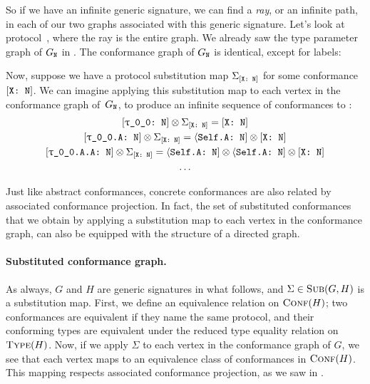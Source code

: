 \documentclass[../generics]{subfiles}
\begin{document}
So if we have an infinite generic signature, we can find a \emph{ray}, or an infinite path, in each of our two graphs associated with this generic signature. Let's look at protocol~\tN, where the ray is the entire graph. We already saw the type parameter graph of $G_{\texttt{N}}$ in . The conformance graph of $G_{\texttt{N}}$ is identical, except for labels:
\begin{center}
\end{center}

Now, suppose we have a protocol substitution map $\Sigma_{[\texttt{X:~N}]}$ for some conformance $[\texttt{X:~N}]$. We can imagine applying this substitution map to each vertex in the conformance graph of~$G_{\texttt{N}}$, to produce an infinite sequence of conformances to \tN:
\begin{gather*}
\ConfReq{\rT}{N}\otimes\Sigma_{\XN}=\XN\\
\ConfReq{\rT.A}{N}\otimes\Sigma_{\XN}=\SelfAToN\otimes\XN\\
\ConfReq{\rT.A.A}{N}\otimes\Sigma_{\XN}=\SelfAToN\otimes\SelfAToN\otimes\XN\\
\ldots
\end{gather*}

Just like abstract conformances, concrete conformances are also related by associated conformance projection. In fact, the set of substituted conformances that we obtain by applying a substitution map to each vertex in the conformance graph, can also be equipped with the structure of a directed graph.

\paragraph{Substituted conformance graph.}
As always, $G$ and $H$ are generic signatures in what follows, and $\Sigma\in\textsc{Sub}({G, H})$ is a substitution map. First, we define an equivalence relation on $\textsc{Conf}({H})$; two conformances are equivalent if they name the same protocol, and their conforming types are equivalent under the reduced type equality relation on $\textsc{Type}({H})$. Now, if we apply $\Sigma$ to each vertex in the conformance graph of $G$, we see that each vertex maps to an equivalence class of conformances in $\textsc{Conf}({H})$. This mapping respects associated conformance projection, as we saw in .
\end{document}
